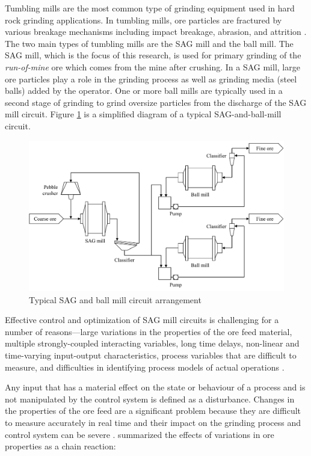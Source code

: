 Tumbling mills are the most common type of grinding equipment used in hard rock grinding applications. In tumbling mills, ore particles are fractured by various breakage mechanisms including impact breakage, abrasion, and attrition \citep{king_chapter_2012}. The two main types of tumbling mills are the \gls{SAG} mill and the ball mill. The \gls{SAG} mill, which is the focus of this research, is used for primary grinding of the \textit{run-of-mine} ore which comes from the mine after crushing. In a \gls{SAG} mill, large ore particles play a role in the grinding process as well as grinding media (steel balls) added by the operator. One or more ball mills are typically used in a second stage of grinding to grind oversize particles from the discharge of the \gls{SAG} mill circuit. Figure \ref{fig:sag-ball-circuit-diag} is a simplified diagram of a typical SAG-and-ball-mill circuit.%
\begin{figure}[htp]
	\centering
	\includegraphics[width=14cm]{images/sag-ball-circuit-diag.pdf}
	\caption{Typical SAG and ball mill circuit arrangement} \label{fig:sag-ball-circuit-diag}
\end{figure}

Effective control and optimization of SAG mill circuits is challenging for a number of reasons---large variations in the properties of the ore feed material, multiple strongly-coupled interacting variables, long time delays, non-linear and time-varying input-output characteristics, process variables that are difficult to measure, and difficulties in identifying process models of actual operations \citep{olivier_dual_2012, gough_sag_2015, le_roux_throughput_2016, aguila-camacho_control_2017}. 

Any input that has a material effect on the state or behaviour of a process and is not manipulated by the control system is defined as a disturbance. Changes in the properties of the ore feed are a significant problem because they are difficult to measure accurately in real time and their impact on the grinding process and control system can be severe \citep{herbst_optimal_1988, garrido_multivariable_2009, remes_grinding_2010, liu_development_2018}. \cite{powell_applying_2009} summarized the effects of variations in ore properties as a chain reaction:

